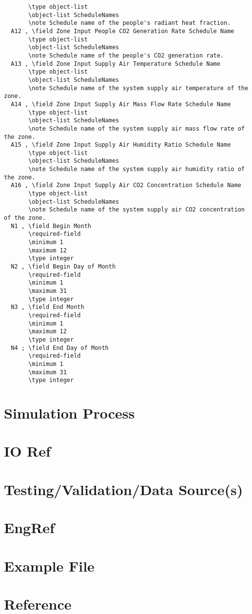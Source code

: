 \documentclass[11pt]{article}
\begin{document}
\begin{verbatim}
       \type object-list
       \object-list ScheduleNames
       \note Schedule name of the people's radiant heat fraction.
  A12 , \field Zone Input People CO2 Generation Rate Schedule Name
       \type object-list
       \object-list ScheduleNames
       \note Schedule name of the people's CO2 generation rate.
  A13 , \field Zone Input Supply Air Temperature Schedule Name
       \type object-list
       \object-list ScheduleNames
       \note Schedule name of the system supply air temperature of the zone.
  A14 , \field Zone Input Supply Air Mass Flow Rate Schedule Name
       \type object-list
       \object-list ScheduleNames
       \note Schedule name of the system supply air mass flow rate of the zone.
  A15 , \field Zone Input Supply Air Humidity Ratio Schedule Name
       \type object-list
       \object-list ScheduleNames
       \note Schedule name of the system supply air humidity ratio of the zone.
  A16 , \field Zone Input Supply Air CO2 Concentration Schedule Name
       \type object-list
       \object-list ScheduleNames
       \note Schedule name of the system supply air CO2 concentration of the zone.
  N1 , \field Begin Month
       \required-field
       \minimum 1
       \maximum 12
       \type integer
  N2 , \field Begin Day of Month
       \required-field
       \minimum 1
       \maximum 31
       \type integer
  N3 , \field End Month
       \required-field
       \minimum 1
       \maximum 12
       \type integer
  N4 ; \field End Day of Month
       \required-field
       \minimum 1
       \maximum 31
       \type integer

\end{verbatim}

\section{Simulation Process}

\section{IO Ref}

\section{Testing/Validation/Data Source(s)}

\section{EngRef}

\section{Example File}

\section{Reference}
\end{document}
